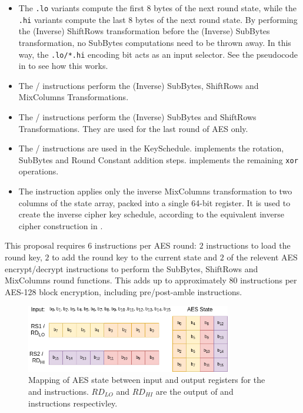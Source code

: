 \begin{itemize}
\item
The {\tt *.lo} variants compute the first 8 bytes of the next round
state, while the {\tt *.hi} variants compute the last 8 bytes of the
next round state.
By performing the (Inverse) ShiftRows transformation before the
(Inverse) SubBytes transformation, no SubBytes computations need to be
thrown away.
In this way, the {\tt *.lo/*.hi} encoding bit acts as an input selector.
See the pseudocode in  to see how this works.
\item
The / instructions perform the
(Inverse) SubBytes, ShiftRows and MixColumns Transformations.
\item
The / instructions perform the
(Inverse) SubBytes and ShiftRows Transformations.
They are used for the last round of AES only.
\item
The / instructions are used in the
KeySchedule.
 implements the rotation, SubBytes and Round Constant
addition steps.
 implements the remaining {\tt xor} operations.
\item
The  instruction applies only the inverse MixColumns
transformation to two columns of the state array, packed into a single
64-bit register.
It is used to create the inverse cipher key schedule, according to
the equivalent inverse cipher construction in
\cite[Page 23, Section 5.3.5]{nist:fips:197}.
\end{itemize}

This proposal requires $6$ instructions per AES round:
$2$  instructions to load the round key,
$2$  to add the round key to the current state
and
$2$ of the relevent AES encrypt/decrypt instructions to perform the
    SubBytes, ShiftRows and MixColumns round functions.
This adds up to approximately $80$ instructions per AES-128 block
encryption, including pre/post-amble instructions.

\begin{figure}[h]
\centering
\includegraphics[width=0.8\textwidth]{diagrams/aes-rv64-state.png}
\caption{
Mapping of AES state between input and output registers for
the  and  instructions.
$RD_{LO}$ and $RD_{HI}$ are the output of 
and  instructions respectivley.
}
\label{fig:aes:rv64:mapping}
\end{figure}

